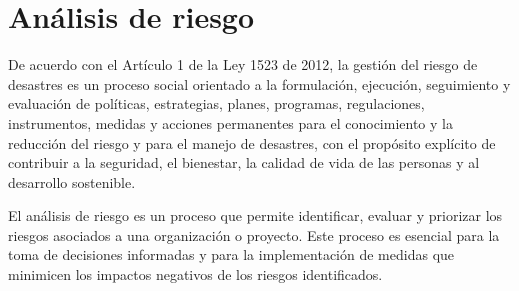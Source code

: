 \section{Análisis de riesgo}
De acuerdo con el Artículo 1 de la Ley 1523 de 2012, la gestión del riesgo de desastres es un proceso social orientado a la formulación, ejecución, seguimiento y evaluación de políticas, estrategias, planes, programas, regulaciones, instrumentos, medidas y acciones permanentes para el conocimiento y la reducción del riesgo y para el manejo de desastres, con el propósito explícito de contribuir a la seguridad, el bienestar, la calidad de vida de las personas y al desarrollo sostenible. 

El análisis de riesgo es un proceso que permite identificar, evaluar y priorizar los riesgos asociados a una organización o proyecto. Este proceso es esencial para la toma de decisiones informadas y para la implementación de medidas que minimicen los impactos negativos de los riesgos identificados.








